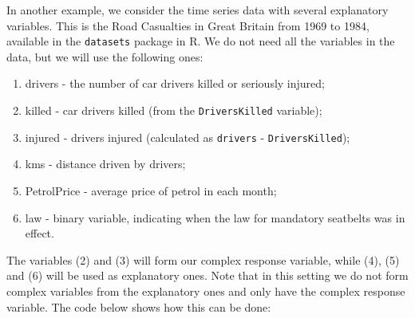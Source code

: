 \documentclass[
]{book}
\newenvironment{Shaded}{\begin{snugshade}}{\end{snugshade}}
\newcommand{\AttributeTok}[1]{\textcolor[rgb]{0.77,0.63,0.00}{#1}}
\newcommand{\CommentTok}[1]{\textcolor[rgb]{0.56,0.35,0.01}{\textit{#1}}}
\newcommand{\FunctionTok}[1]{\textcolor[rgb]{0.00,0.00,0.00}{#1}}
\newcommand{\NormalTok}[1]{#1}
\newcommand{\OtherTok}[1]{\textcolor[rgb]{0.56,0.35,0.01}{#1}}
\newcommand{\SpecialCharTok}[1]{\textcolor[rgb]{0.00,0.00,0.00}{#1}}
\newcommand{\StringTok}[1]{\textcolor[rgb]{0.31,0.60,0.02}{#1}}
\providecommand{\tightlist}{%
  \setlength{\itemsep}{0pt}\setlength{\parskip}{0pt}}
\begin{document}
In another example, we consider the time series data with several explanatory variables. This is the Road Casualties in Great Britain from 1969 to 1984, available in the \texttt{datasets} package in R. We do not need all the variables in the data, but we will use the following ones:

\begin{enumerate}
\def\labelenumi{\arabic{enumi}.}
\tightlist
\item
  drivers - the number of car drivers killed or seriously injured;
\item
  killed - car drivers killed (from the \texttt{DriversKilled} variable);
\item
  injured - drivers injured (calculated as \texttt{drivers} - \texttt{DriversKilled});
\item
  kms - distance driven by drivers;
\item
  PetrolPrice - average price of petrol in each month;
\item
  law - binary variable, indicating when the law for mandatory seatbelts was in effect.
\end{enumerate}

The variables (2) and (3) will form our complex response variable, while (4), (5) and (6) will be used as explanatory ones. Note that in this setting we do not form complex variables from the explanatory ones and only have the complex response variable. The code below shows how this can be done:

\begin{Shaded}
\end{Shaded}
\end{document}
